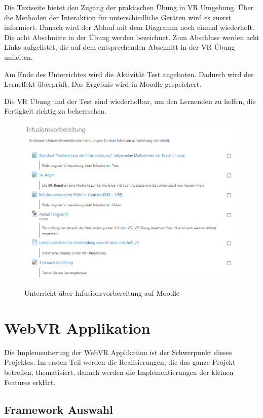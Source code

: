  Die Textseite bietet den Zugang der praktischen Übung in VR Umgebung. Über die Methoden der Interaktion für unterschiedliche Geräten wird es zuerst informiert. Danach wird der Ablauf mit dem Diagramm noch einmal wiederholt. Die acht Abschnitte in der Übung werden bezeichnet. Zum Abschluss werden acht Links aufgelistet, die auf dem entsprechenden Abschnitt in der VR Übung umleiten.
 
 Am Ende des Unterrichtes wird die Aktivität Test angeboten. Dadurch wird der Lerneffekt überprüft. Das Ergebnis wird in Moodle gespeichert.
 
 Die VR Übung und der Test sind wiederholbar, um den Lernenden zu helfen, die Fertigkeit richtig zu beherrschen.
 
\begin{figure}[ht]
\centering
\vspace{1em}
\caption{Unterricht über Infusionsvorbereitung auf Moodle}
\includegraphics[width=\textwidth]{images/unterricht.png}
\label{fig:unterricht}
\end{figure}
 
\section{WebVR Applikation}
Die Implementierung der WebVR Applikation ist der Schwerpunkt dieses Projektes. Im ersten Teil werden die Realisierungen, die das ganze Projekt betreffen, thematisiert, danach werden die Implementierungen der kleinen Features erklärt.

 \subsection{Framework Auswahl}
 
